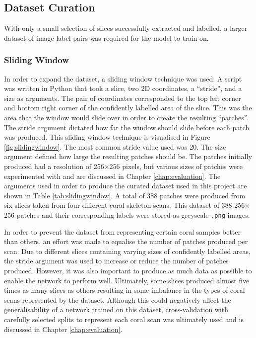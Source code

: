 \subsection{Dataset Curation}
\label{sec:datasetcuration}

With only a small selection of slices successfully extracted and labelled, a larger dataset of image-label pairs was required for the model to train on.

\subsubsection{Sliding Window}

In order to expand the dataset, a sliding window technique was used. A script was written in Python that took a slice, two 2D coordinates, a ``stride'', and a size as arguments. The pair of coordinates corresponded to the top left corner and bottom right corner of the confidently labelled area of the slice. This was the area that the window would slide over in order to create the resulting ``patches''. The stride argument dictated how far the window should slide before each patch was produced. This sliding window technique is visualised in Figure \ref{fig:slidingwindow}. The most common stride value used was 20. The size argument defined how large the resulting patches should be. The patches initially produced had a resolution of 256$\times$256 pixels, but various sizes of patches were experimented with and are discussed in Chapter \ref{chap:evaluation}. The arguments used in order to produce the curated dataset used in this project are shown in Table \ref{tab:slidingwindow}. A total of 388 patches were produced from six slices taken from four different coral skeleton scans. This dataset of 388 256$\times$256 patches and their corresponding labels were stored as greyscale \texttt{.png} images.

In order to prevent the dataset from representing certain coral samples better than others, an effort was made to equalise the number of patches produced per scan. Due to different slices containing varying sizes of confidently labelled areas, the stride argument was used to increase or reduce the number of patches produced. However, it was also important to produce as much data as possible to enable the network to perform well. Ultimately, some slices produced almost five times as many slices as others resulting in some imbalance in the types of coral scans represented by the dataset. Although this could negatively affect the generalisability of a network trained on this dataset, cross-validation with carefully selected splits to represent each coral scan was ultimately used and is discussed in Chapter \ref{chap:evaluation}.

